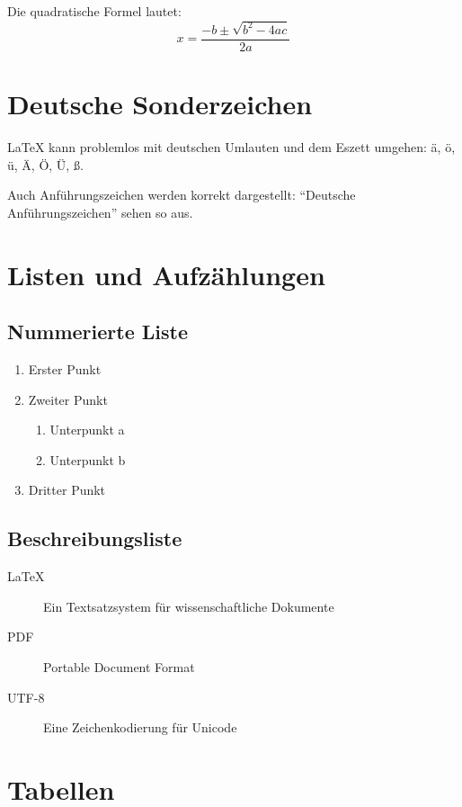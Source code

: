 \documentclass[12pt,a4paper]{article}
\begin{document}
Die quadratische Formel lautet:
\begin{equation}
    x = \frac{-b \pm \sqrt{b^2 - 4ac}}{2a}
\end{equation}

\section{Deutsche Sonderzeichen}

LaTeX kann problemlos mit deutschen Umlauten und dem Eszett umgehen: ä, ö, ü, Ä, Ö, Ü, ß.

Auch Anführungszeichen werden korrekt dargestellt: "`Deutsche Anführungszeichen"' sehen so aus.

\section{Listen und Aufzählungen}

\subsection{Nummerierte Liste}
\begin{enumerate}
    \item Erster Punkt
    \item Zweiter Punkt
        \begin{enumerate}
            \item Unterpunkt a
            \item Unterpunkt b
        \end{enumerate}
    \item Dritter Punkt
\end{enumerate}

\subsection{Beschreibungsliste}
\begin{description}
    \item[LaTeX] Ein Textsatzsystem für wissenschaftliche Dokumente
    \item[PDF] Portable Document Format
    \item[UTF-8] Eine Zeichenkodierung für Unicode
\end{description}

\section{Tabellen}
\end{document}

